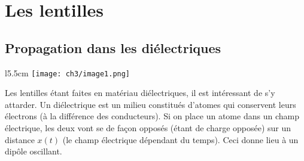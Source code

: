 \chapter{Les lentilles}

\section{Propagation dans les diélectriques}
\begin{wrapfigure}[10]{l}{5.5cm}
	\vspace{-5mm}
	\texttt{[image: ch3/image1.png]}
	\end{wrapfigure}	
Les lentilles étant faites en matériau diélectriques, il est intéressant de s'y attarder. Un diélectrique 
est un milieu constitués d'atomes qui conservent leurs électrons (à la différence des conducteurs). Si on 
place un atome dans un champ électrique, les deux vont se de façon opposés (étant de charge opposée) sur 
un distance $x(t)$ (le champ électrique dépendant du temps). Ceci donne lieu à un dipôle oscillant.\\

